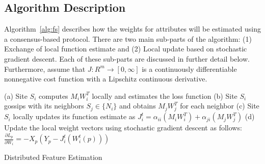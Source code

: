 \subsection{Algorithm Description}
\label{algo}

\noindent Algorithm~\ref{alg:fs} describes how the weights for attributes will be estimated using a consensus-based protocol. There are two main sub-parts of the algorithm: (1) Exchange of local function estimate and (2) Local update based on stochastic gradient descent. Each of these sub-parts are discussed in further detail below.   Furthermore, assume that $J: R^m \rightarrow [0, \infty]$ is a continuously differentiable nonnegative cost function with a Lipschitz continuous derivative.\\

\begin{algorithm}[t]
\small
{

\BlankLine

 {
  (a) Site $S_i$ computes $M_i W_i^T$ locally and estimates the loss function\;
  (b) Site $S_i$ gossips with its neighbors $S_j \in \{N_i\}$ and obtains $M_j W_j^T$ for each neighbor\;
  (c) Site $S_i$ locally updates its function estimate as $J_i^t = \alpha_{ii}(M_i W_i^T) + \alpha_{ji} (M_j W_j^T)$ \;
  (d) Update the local weight vectors using stochastic gradient descent as follows: $\frac{\partial L_p}{\partial W_i} = -X_p (Y_p - J_i^t(W_i^t(p)))$
 }
 
\caption{Distributed Feature Estimation}
\label{alg:fs}
}
\end{algorithm}


